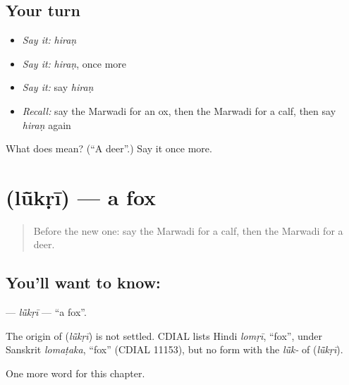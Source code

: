 \subsection*{Your turn}
\begin{itemize}
\raggedright
  \item \emph{Say it:} \emph{hiraṇ}
  \item \emph{Say it:} \emph{hiraṇ}, once more
  \item \emph{Say it:} say \emph{hiraṇ}
  \item \emph{Recall:} say the Marwadi for an ox, then the Marwadi for a calf, then say \emph{hiraṇ} again
\end{itemize}

\begin{tcolorbox}[breakable,colback=teal!4,colframe=teal!35!black,title={Before you move on}]
What does  mean? (\textquotedblleft{}A deer\textquotedblright{}.) Say it once more.
\end{tcolorbox}
\section[\texorpdfstring{\mw{लूंकड़ी} (lū̃kṛī)}{लूंकड़ी (lū̃kṛī)}]{ (lū̃kṛī) — a fox}

\label{lesson:MW-C138-lukri}



\begin{quote}
Before the new one: say the Marwadi for a calf, then the Marwadi for a deer.
\end{quote}

\subsection*{You'll want to know: }
\textbf{} — \emph{lū̃kṛī} — \textquotedblleft{}a fox\textquotedblright{}.

\begin{cousinweb}
The origin of \textbf{} (\emph{lū̃kṛī}) is not settled. CDIAL lists Hindi \emph{lomṛī}, \textquotedblleft{}fox\textquotedblright{}, under Sanskrit \emph{lomaṭaka}, \textquotedblleft{}fox\textquotedblright{} (CDIAL 11153), but no form with the \emph{lū̃k-} of \textbf{} (\emph{lū̃kṛī}).
\end{cousinweb}

\begin{grammarlens}[title={What you've built}]
One more word for this chapter.
\end{grammarlens}


